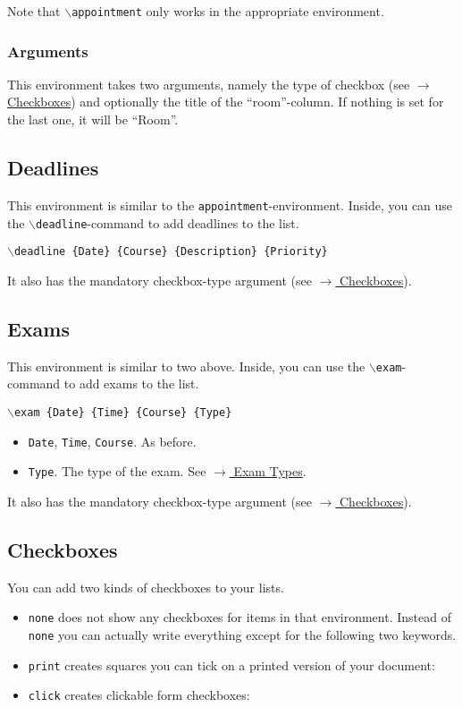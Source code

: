 \documentclass[english]{article}
\newcommand{\cmd}[1]{$\backslash$\texttt{{#1}}}
\begin{document}
	
	Note that \cmd{appointment} only works in the appropriate environment.
	
	\subsubsection{Arguments}
	This environment takes two arguments, namely the type of checkbox (see \hyperref[checkboxes]{$\rightarrow$ Checkboxes}) and optionally the title of the \enquote{room}-column. If nothing is set for the last one, it will be \enquote{Room}.

	\subsection{Deadlines}
	\label{deadlines}
	This environment is similar to the \texttt{appointment}-environment. Inside, you can use the \cmd{deadline}-command to add deadlines to the list.
	\begin{center}
		\cmd{deadline \{Date\} \{Course\} \{Description\} \{Priority\}}
	\end{center}
	It also has the mandatory checkbox-type argument (see \hyperref[checkboxes]{$\rightarrow$ Checkboxes}).


	\subsection{Exams}
	\label{Exams}
	This environment is similar to two above. Inside, you can use the \cmd{exam}-command to add exams to the list.
	\begin{center}
		\cmd{exam \{Date\} \{Time\} \{Course\} \{Type\}}
	\end{center}
	\begin{itemize}
		\item \texttt{Date}, \texttt{Time}, \texttt{Course}.
		As before.
		
		\item \texttt{Type}.
		The type of the exam. See \hyperref[examtypes]{$\rightarrow$ Exam Types}.
	\end{itemize}
	It also has the mandatory checkbox-type argument (see \hyperref[checkboxes]{$\rightarrow$ Checkboxes}).

	\subsection{Checkboxes}
	\label{checkboxes}
	You can add two kinds of checkboxes to your lists. 
	\begin{itemize}
		\item 
		\texttt{none} does not show any checkboxes for items in that environment. Instead of \texttt{none} you can actually write everything except for the following two keywords.
		
		\item
		\texttt{print} creates squares you can tick on a printed version of your document: \checkbox{\printcheckboxcmd}
		
		\item
		\texttt{click} creates clickable form checkboxes: \checkbox{\clickcheckboxcmd}
		
		
	\end{itemize}
\end{document}
